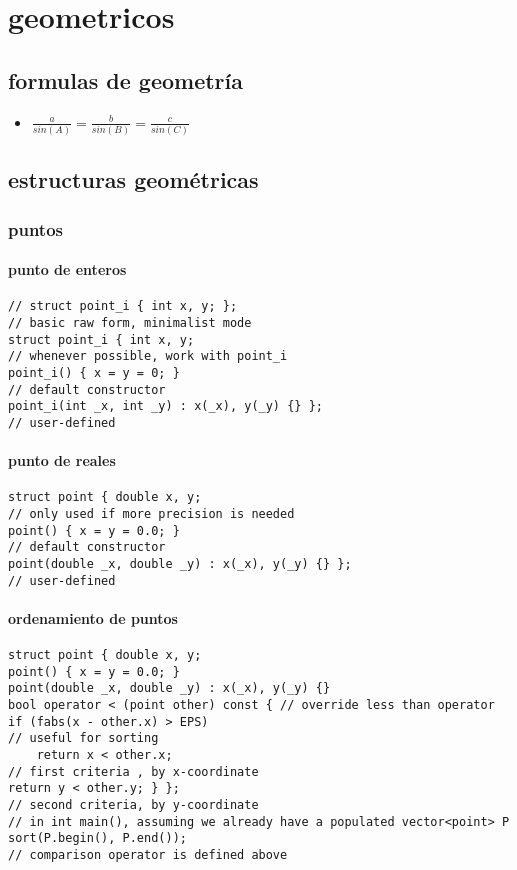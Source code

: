 \chapter{geometricos}
\section{formulas de geometría}
\begin{itemize}
\item $\frac{a}{sin(A)}=\frac{b}{sin(B)}=\frac{c}{sin(C)}$ 
\end{itemize}
\section{estructuras geométricas}
\subsection{puntos}
\subsubsection{punto de enteros}
\begin{lstlisting}[style=C]
// struct point_i { int x, y; };
// basic raw form, minimalist mode
struct point_i { int x, y;
// whenever possible, work with point_i
point_i() { x = y = 0; }
// default constructor
point_i(int _x, int _y) : x(_x), y(_y) {} };
// user-defined
\end{lstlisting}
\subsubsection{punto de reales}
\begin{lstlisting}[style=C]
struct point { double x, y;
// only used if more precision is needed
point() { x = y = 0.0; }
// default constructor
point(double _x, double _y) : x(_x), y(_y) {} };
// user-defined
\end{lstlisting}
\subsubsection{ordenamiento de puntos}
\begin{lstlisting}[style=C]
struct point { double x, y;
point() { x = y = 0.0; }
point(double _x, double _y) : x(_x), y(_y) {}
bool operator < (point other) const { // override less than operator
if (fabs(x - other.x) > EPS)
// useful for sorting
	return x < other.x;
// first criteria , by x-coordinate
return y < other.y; } };
// second criteria, by y-coordinate
// in int main(), assuming we already have a populated vector<point> P
sort(P.begin(), P.end());
// comparison operator is defined above
\end{lstlisting}
